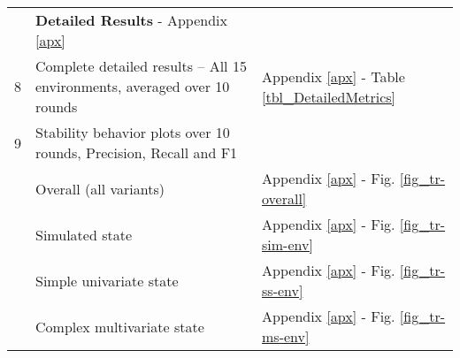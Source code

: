 \documentclass[referee, sn-mathphys-num]{sn-jnl}
\newcommand{\ltmidrule} {\arrayrulecolor{black!20} \midrule}
\begin{document}
\begin{table}
{\begin{tabular}{R{0.25cm} L{11.5cm} L{3cm}}
				 & \textbf{Detailed Results} - Appendix \ref{apx} & \\
				8 & Complete detailed results -- All 15 environments, averaged over 10 rounds & Appendix \ref{apx} - Table \ref{tbl_DetailedMetrics}\\\ltmidrule
				
				9 & Stability behavior plots over 10 rounds, Precision, Recall and F1\\
				& \quad\quad Overall (all variants)  & Appendix \ref{apx} - Fig. \ref{fig_tr-overall}\\
				& \quad\quad Simulated state & Appendix \ref{apx} - Fig. \ref{fig_tr-sim-env}\\
				& \quad\quad Simple univariate state & Appendix \ref{apx} - Fig. \ref{fig_tr-ss-env}\\
				& \quad\quad Complex multivariate state & Appendix \ref{apx} - Fig. \ref{fig_tr-ms-env}\\
				\bottomrule
		\end{tabular}}
		\label{tbl_ref-results}
	\end{table}
	
\end{document}
